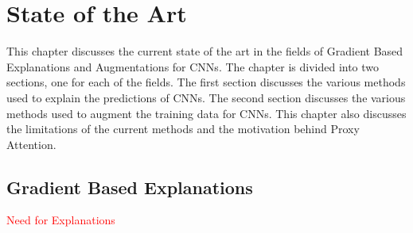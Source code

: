 \chapter{State of the Art} \label{ch:sota}
This chapter discusses the current state of the art in the fields of Gradient Based Explanations and Augmentations for CNNs. The chapter is divided into two sections, one for each of the fields. The first section discusses the various methods used to explain the predictions of CNNs. The second section discusses the various methods used to augment the training data for CNNs. This chapter also discusses the limitations of the current methods and the motivation behind Proxy Attention.

\section{Gradient Based Explanations} \label{sec:gradient_based_explanations}
\textcolor{red}{Need for Explanations}







